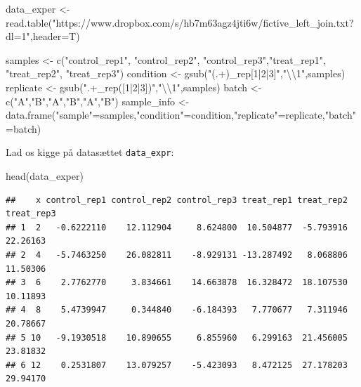 \documentclass[
]{book}
\newenvironment{Shaded}{\begin{snugshade}}{\end{snugshade}}
\newcommand{\AttributeTok}[1]{\textcolor[rgb]{0.77,0.63,0.00}{#1}}
\newcommand{\FunctionTok}[1]{\textcolor[rgb]{0.00,0.00,0.00}{#1}}
\newcommand{\NormalTok}[1]{#1}
\newcommand{\OtherTok}[1]{\textcolor[rgb]{0.56,0.35,0.01}{#1}}
\newcommand{\SpecialCharTok}[1]{\textcolor[rgb]{0.00,0.00,0.00}{#1}}
\newcommand{\StringTok}[1]{\textcolor[rgb]{0.31,0.60,0.02}{#1}}
\begin{document}
\begin{Shaded}
\begin{Highlighting}[]
\NormalTok{data\_exper }\OtherTok{\textless{}{-}} \FunctionTok{read.table}\NormalTok{(}\StringTok{"https://www.dropbox.com/s/hb7m63agz4jti6w/fictive\_left\_join.txt?dl=1"}\NormalTok{,}\AttributeTok{header=}\NormalTok{T)}

\NormalTok{samples }\OtherTok{\textless{}{-}} \FunctionTok{c}\NormalTok{(}\StringTok{"control\_rep1"}\NormalTok{, }\StringTok{"control\_rep2"}\NormalTok{, }\StringTok{"control\_rep3"}\NormalTok{,}\StringTok{"treat\_rep1"}\NormalTok{, }\StringTok{"treat\_rep2"}\NormalTok{, }\StringTok{"treat\_rep3"}\NormalTok{)}
\NormalTok{condition }\OtherTok{\textless{}{-}} \FunctionTok{gsub}\NormalTok{(}\StringTok{"(.+)\_rep[1|2|3]"}\NormalTok{,}\StringTok{"}\SpecialCharTok{\textbackslash{}\textbackslash{}}\StringTok{1"}\NormalTok{,samples)}
\NormalTok{replicate }\OtherTok{\textless{}{-}} \FunctionTok{gsub}\NormalTok{(}\StringTok{".+\_rep([1|2|3])"}\NormalTok{,}\StringTok{"}\SpecialCharTok{\textbackslash{}\textbackslash{}}\StringTok{1"}\NormalTok{,samples)}
\NormalTok{batch }\OtherTok{\textless{}{-}} \FunctionTok{c}\NormalTok{(}\StringTok{"A"}\NormalTok{,}\StringTok{"B"}\NormalTok{,}\StringTok{"A"}\NormalTok{,}\StringTok{"B"}\NormalTok{,}\StringTok{"A"}\NormalTok{,}\StringTok{"B"}\NormalTok{)}
\NormalTok{sample\_info }\OtherTok{\textless{}{-}} \FunctionTok{data.frame}\NormalTok{(}\StringTok{"sample"}\OtherTok{=}\NormalTok{samples,}\StringTok{"condition"}\OtherTok{=}\NormalTok{condition,}\StringTok{"replicate"}\OtherTok{=}\NormalTok{replicate,}\StringTok{"batch"}\OtherTok{=}\NormalTok{batch)}
\end{Highlighting}
\end{Shaded}

Lad os kigge på datasættet \texttt{data\_expr}:

\begin{Shaded}
\begin{Highlighting}[]
\FunctionTok{head}\NormalTok{(data\_exper)}
\end{Highlighting}
\end{Shaded}

\begin{verbatim}
##    x control_rep1 control_rep2 control_rep3 treat_rep1 treat_rep2 treat_rep3
## 1  2   -0.6222110    12.112904     8.624800  10.504877  -5.793916   22.26163
## 2  4   -5.7463250    26.082811    -8.929131 -13.287492   8.068806   11.50306
## 3  6    2.7762770     3.834661    14.663878  16.328472  18.107530   10.11893
## 4  8    5.4739947     0.344840    -6.184393   7.770677   7.311946   20.78667
## 5 10   -9.1930518    10.890655     6.855960   6.299163  21.456005   23.81832
## 6 12    0.2531807    13.079257    -5.423093   8.472125  27.178203   29.94170
\end{verbatim}
\end{document}
